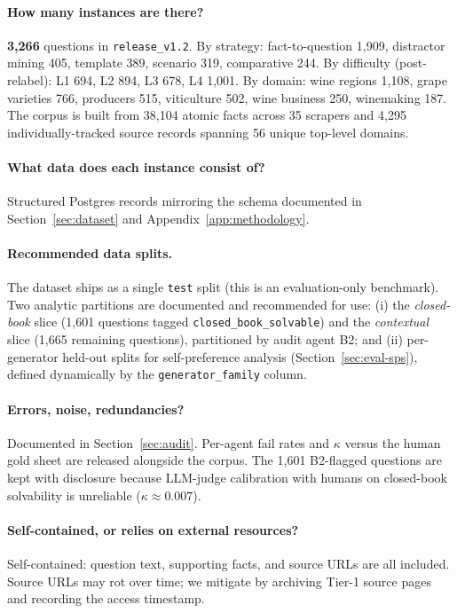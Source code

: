\paragraph{How many instances are there?}
\textbf{3{,}266} questions in \texttt{release\_v1.2}. By strategy:
fact-to-question 1{,}909, distractor mining 405, template 389,
scenario 319, comparative 244. By difficulty (post-relabel):
L1 694, L2 894, L3 678, L4 1{,}001. By domain: wine regions 1{,}108,
grape varieties 766, producers 515, viticulture 502, wine business 250,
winemaking 187. The corpus is built from 38{,}104 atomic facts across
35 scrapers and 4{,}295 individually-tracked source records
spanning 56 unique top-level domains.

\paragraph{What data does each instance consist of?}
Structured Postgres records mirroring the schema documented in
Section~\ref{sec:dataset} and Appendix~\ref{app:methodology}.

\paragraph{Recommended data splits.}
The dataset ships as a single \texttt{test} split (this is an
evaluation-only benchmark). Two analytic partitions are documented and
recommended for use:
(i) the \emph{closed-book} slice (1{,}601 questions tagged
\texttt{closed\_book\_solvable}) and the \emph{contextual} slice
(1{,}665 remaining questions), partitioned by audit agent B2; and
(ii) per-generator held-out splits for self-preference analysis
(Section~\ref{sec:eval-sps}), defined dynamically by the
\texttt{generator\_family} column.

\paragraph{Errors, noise, redundancies?}
Documented in Section~\ref{sec:audit}. Per-agent fail rates and
$\kappa$ versus the human gold sheet are released alongside the
corpus. The 1{,}601 B2-flagged questions are kept with disclosure
because LLM-judge calibration with humans on closed-book solvability
is unreliable ($\kappa \approx 0.007$).

\paragraph{Self-contained, or relies on external resources?}
Self-contained: question text, supporting facts, and source URLs are
all included. Source URLs may rot over time; we mitigate by archiving
Tier-1 source pages and recording the access timestamp.

